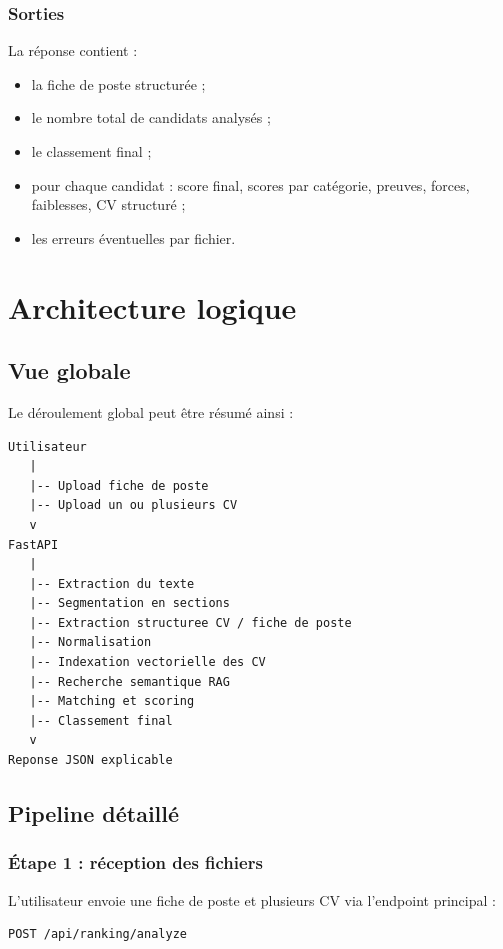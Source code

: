 \documentclass[12pt,a4paper]{report}
\begin{document}
\subsection{Sorties}

La réponse contient :

\begin{itemize}
    \item la fiche de poste structurée ;
    \item le nombre total de candidats analysés ;
    \item le classement final ;
    \item pour chaque candidat : score final, scores par catégorie, preuves, forces, faiblesses, CV structuré ;
    \item les erreurs éventuelles par fichier.
\end{itemize}

\chapter{Architecture logique}

\section{Vue globale}

Le déroulement global peut être résumé ainsi :

\begin{lstlisting}
Utilisateur
   |
   |-- Upload fiche de poste
   |-- Upload un ou plusieurs CV
   v
FastAPI
   |
   |-- Extraction du texte
   |-- Segmentation en sections
   |-- Extraction structuree CV / fiche de poste
   |-- Normalisation
   |-- Indexation vectorielle des CV
   |-- Recherche semantique RAG
   |-- Matching et scoring
   |-- Classement final
   v
Reponse JSON explicable
\end{lstlisting}

\section{Pipeline détaillé}

\subsection{Étape 1 : réception des fichiers}

L'utilisateur envoie une fiche de poste et plusieurs CV via l'endpoint principal :

\begin{lstlisting}
POST /api/ranking/analyze
\end{lstlisting}
\end{document}
